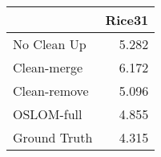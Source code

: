\begin{tabular}{lr}
\toprule
{} & Rice31 \\
\midrule
No Clean Up  &  5.282 \\
Clean-merge  &  6.172 \\
Clean-remove &  5.096 \\
OSLOM-full   &  4.855 \\
Ground Truth &  4.315 \\
\bottomrule
\end{tabular}
